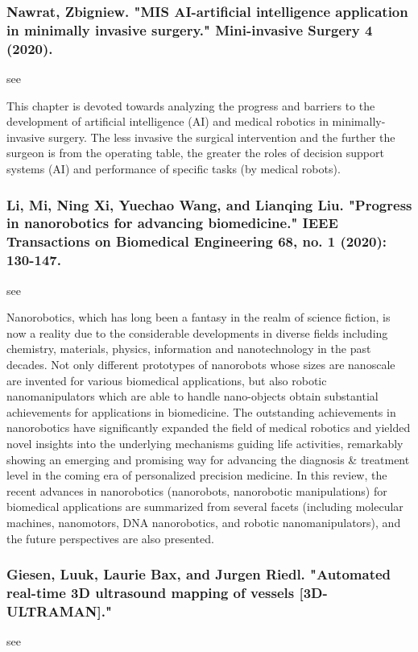 \documentclass[conference]{IEEEtran}
\begin{document}
\medskip
\subsubsection{Nawrat, Zbigniew. "MIS AI-artificial intelligence application in minimally invasive surgery." Mini-invasive Surgery 4 (2020).}
see \cite{nawrat2020mis}

This chapter is devoted towards analyzing the progress and barriers to the development of artificial intelligence (AI) and medical robotics in minimally-invasive surgery. The less invasive the surgical intervention and the further the surgeon is from the operating table, the greater the roles of decision support systems (AI) and performance of specific tasks (by medical robots).

\medskip
\subsubsection{Li, Mi, Ning Xi, Yuechao Wang, and Lianqing Liu. "Progress in nanorobotics for advancing biomedicine." IEEE Transactions on Biomedical Engineering 68, no. 1 (2020): 130-147.}
see \cite{li2020progress}

Nanorobotics, which has long been a fantasy in the realm of science fiction, is now a reality due to the considerable developments in diverse fields including chemistry, materials, physics, information and nanotechnology in the past decades. Not only different prototypes of nanorobots whose sizes are nanoscale are invented for various biomedical applications, but also robotic nanomanipulators which are able to handle nano-objects obtain substantial achievements for applications in biomedicine. The outstanding achievements in nanorobotics  have significantly expanded the field of medical robotics and yielded novel insights into the underlying mechanisms guiding life activities, remarkably showing an emerging and promising way for advancing the diagnosis \& treatment level in the coming era of personalized precision medicine. In this review, the recent advances in nanorobotics (nanorobots, nanorobotic manipulations) for biomedical applications are summarized from several facets (including molecular machines, nanomotors, DNA nanorobotics, and robotic nanomanipulators), and the future perspectives are also presented.

\medskip
\subsubsection{Giesen, Luuk, Laurie Bax, and Jurgen Riedl. "Automated real-time 3D ultrasound mapping of vessels [3D-ULTRAMAN]."}
see \cite{giesenautomated}
\end{document}
